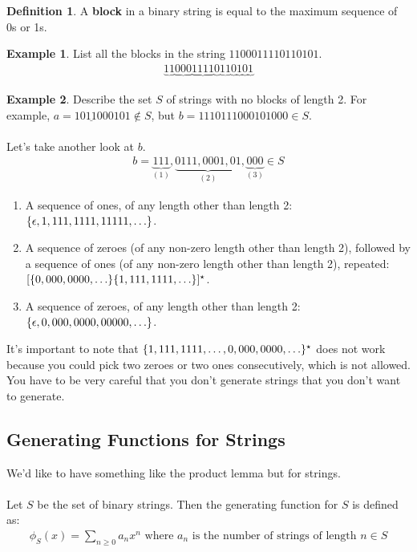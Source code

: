 \documentclass[]{article}
\theoremstyle{definition}
\newtheorem*{defn}{Definition}
\newtheorem{ex}{Example}[section]
\DeclarePairedDelimiter{\set}{\lbrace}{\rbrace}
\begin{document}
		\begin{defn}
			A \textbf{block} in a binary string is equal to the maximum sequence of 0s or 1s.
		\end{defn}

		\begin{ex}
			List all the blocks in the string $1100011110110101$.
			\begin{align*}
				\underbrace{11} \underbrace{000} \underbrace{1111} \underbrace{0} \underbrace{11} \underbrace{0} \underbrace{1} \underbrace{0} \underbrace{1}
			\end{align*}
		\end{ex}

		\begin{ex}
			Describe the set $S$ of strings with no blocks of length 2. For example, $a = 10\underline{11}000101 \not \in S$, but $b = 1110111000101000 \in S$.
			\\ \\
			Let's take another look at $b$.
			\begin{align*}
				b = \underbrace{111}_{(1)},\underbrace{0111,0001,01}_{(2)},\underbrace{000}_{(3)} \in S
			\end{align*}

			\begin{enumerate}
				\item A sequence of ones, of any length other than length 2: $\set{\epsilon, 1, 111, 1111, 11111, \ldots }$.
				\item A sequence of zeroes (of any non-zero length other than length 2), followed by a sequence of ones (of any non-zero length other than length 2), repeated: $[ \set{0, 000, 0000, \ldots } \set{1, 111, 1111, \ldots } ]^\star$.
				\item A sequence of zeroes, of any length other than length 2: $\set{\epsilon, 0, 000, 0000, 00000, \ldots }$.
			\end{enumerate}

			It's important to note that $\set{1, 111, 1111, \ldots, 0, 000, 0000, \ldots }^\star$ does not work because you could pick two zeroes or two ones consecutively, which is not allowed. You have to be very careful that you don't generate strings that you don't want to generate.
		\end{ex}

		\subsection{Generating Functions for Strings}
			We'd like to have something like the product lemma but for strings.
			\\ \\
			Let $S$ be the set of binary strings. Then the generating function for $S$ is defined as:
			\begin{align*}
				\phi_S(x) = \sum_{n \ge 0} a_n x^n \text{ where } a_n \text{ is the number of strings of length } n \in S
			\end{align*}
\end{document}
